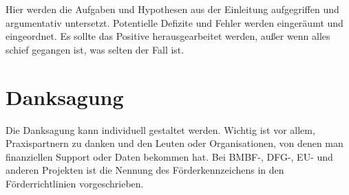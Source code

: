 \documentclass[english,ngerman,BCOR=6mm,cdgeometry=no,DIV=13]{tudscrreprt}
\begin{document}
Hier werden die Aufgaben und Hypothesen aus der Einleitung aufgegriffen und
argumentativ untersetzt. Potentielle Defizite und Fehler werden eingeräumt und
eingeordnet. Es sollte das Positive herausgearbeitet werden, außer wenn alles
schief gegangen ist, was selten der Fall ist.

\chapter{Danksagung}

Die Danksagung kann individuell gestaltet werden. Wichtig ist vor allem,
Praxispartnern zu danken und den Leuten oder Organisationen, von denen man
finanziellen Support oder Daten bekommen hat. Bei BMBF-, DFG-, EU- und anderen
Projekten ist die Nennung des Förderkennzeichens in den Förderrichtlinien
vorgeschrieben.


\printbibliography
\end{document}
